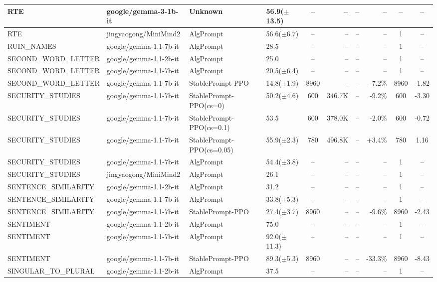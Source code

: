 {\begin{longtable}{@{}p{5.5cm}p{4.5cm}p{2.5cm}lcrrrcc@{}}
\midrule
RTE & google/gemma-3-1b-it & Unknown & 56.9($\pm$13.5) & -- & -- & -- & -- & -- & -- \\
\midrule
RTE & jingyaogong/MiniMind2 & AlgPrompt & 56.6($\pm$6.7) & -- & -- & -- & -- & 1 & -- \\
\midrule
RUIN\_NAMES & google/gemma-1.1-7b-it & AlgPrompt & 28.5 & -- & -- & -- & -- & 1 & -- \\
\midrule
SECOND\_WORD\_LETTER & google/gemma-1.1-2b-it & AlgPrompt & 25.0 & -- & -- & -- & -- & 1 & -- \\
\midrule
SECOND\_WORD\_LETTER & google/gemma-1.1-7b-it & AlgPrompt & 20.5($\pm$6.4) & -- & -- & -- & -- & 1 & -- \\
SECOND\_WORD\_LETTER & google/gemma-1.1-7b-it & StablePrompt-PPO & 14.8($\pm$1.9) & 8960 & -- & -- & -7.2\% & 8960 & -1.82 \\
\midrule
SECURITY\_STUDIES & google/gemma-1.1-7b-it & StablePrompt-PPO(cs=0) & 50.2($\pm$4.6) & 600 & 346.7K & -- & -9.2\% & 600 & -3.30 \\
SECURITY\_STUDIES & google/gemma-1.1-7b-it & StablePrompt-PPO(cs=0.1) & 53.5 & 600 & 378.0K & -- & -2.0\% & 600 & -0.72 \\
SECURITY\_STUDIES & google/gemma-1.1-7b-it & StablePrompt-PPO(cs=0.05) & 55.9($\pm$2.3) & 780 & 496.8K & -- & +3.4\% & 780 & 1.16 \\
SECURITY\_STUDIES & google/gemma-1.1-7b-it & AlgPrompt & 54.4($\pm$3.8) & -- & -- & -- & -- & 1 & -- \\
\midrule
SECURITY\_STUDIES & jingyaogong/MiniMind2 & AlgPrompt & 26.1 & -- & -- & -- & -- & 1 & -- \\
\midrule
SENTENCE\_SIMILARITY & google/gemma-1.1-2b-it & AlgPrompt & 31.2 & -- & -- & -- & -- & 1 & -- \\
\midrule
SENTENCE\_SIMILARITY & google/gemma-1.1-7b-it & AlgPrompt & 33.8($\pm$5.3) & -- & -- & -- & -- & 1 & -- \\
SENTENCE\_SIMILARITY & google/gemma-1.1-7b-it & StablePrompt-PPO & 27.4($\pm$3.7) & 8960 & -- & -- & -9.6\% & 8960 & -2.43 \\
\midrule
SENTIMENT & google/gemma-1.1-2b-it & AlgPrompt & 75.0 & -- & -- & -- & -- & 1 & -- \\
\midrule
SENTIMENT & google/gemma-1.1-7b-it & AlgPrompt & 92.0($\pm$11.3) & -- & -- & -- & -- & 1 & -- \\
SENTIMENT & google/gemma-1.1-7b-it & StablePrompt-PPO & 89.3($\pm$5.3) & 8960 & -- & -- & -33.3\% & 8960 & -8.43 \\
\midrule
SINGULAR\_TO\_PLURAL & google/gemma-1.1-2b-it & AlgPrompt & 37.5 & -- & -- & -- & -- & 1 & -- \\

\end{longtable}}
